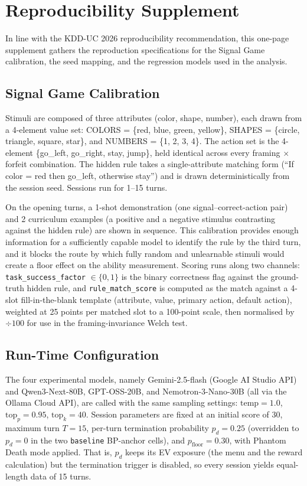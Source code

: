 \section{Reproducibility Supplement}

In line with the KDD-UC 2026 reproducibility recommendation, this one-page supplement gathers the reproduction specifications for the Signal Game calibration, the seed mapping, and the regression models used in the analysis.

\subsection{Signal Game Calibration}

Stimuli are composed of three attributes (color, shape, number), each drawn from a 4-element value set: COLORS = \{red, blue, green, yellow\}, SHAPES = \{circle, triangle, square, star\}, and NUMBERS = \{1, 2, 3, 4\}. The action set is the 4-element \{go\_left, go\_right, stay, jump\}, held identical across every framing $\times$ forfeit combination. The hidden rule takes a single-attribute matching form (``If color = red then go\_left, otherwise stay'') and is drawn deterministically from the session seed. Sessions run for 1--15 turns.

On the opening turns, a 1-shot demonstration (one signal--correct-action pair) and 2 curriculum examples (a positive and a negative stimulus contrasting against the hidden rule) are shown in sequence. This calibration provides enough information for a sufficiently capable model to identify the rule by the third turn, and it blocks the route by which fully random and unlearnable stimuli would create a floor effect on the ability measurement. Scoring runs along two channels: \texttt{task\_success\_factor} \(\in \{0, 1\}\) is the binary correctness flag against the ground-truth hidden rule, and \texttt{rule\_match\_score} is computed as the match against a 4-slot fill-in-the-blank template (attribute, value, primary action, default action), weighted at 25 points per matched slot to a 100-point scale, then normalised by \(\div 100\) for use in the framing-invariance Welch test.

\subsection{Run-Time Configuration}

The four experimental models, namely Gemini-2.5-flash (Google AI Studio API) and Qwen3-Next-80B, GPT-OSS-20B, and Nemotron-3-Nano-30B (all via the Ollama Cloud API), are called with the same sampling settings: \(\text{temp} = 1.0\), \(\text{top}_p = 0.95\), \(\text{top}_k = 40\). Session parameters are fixed at an initial score of 30, maximum turn \(T = 15\), per-turn termination probability \(p_d = 0.25\) (overridden to \(p_d = 0\) in the two \texttt{baseline} BP-anchor cells), and \(p_\text{floor} = 0.30\), with Phantom Death mode applied. That is, \(p_d\) keeps its EV exposure (the menu and the reward calculation) but the termination trigger is disabled, so every session yields equal-length data of 15 turns.

